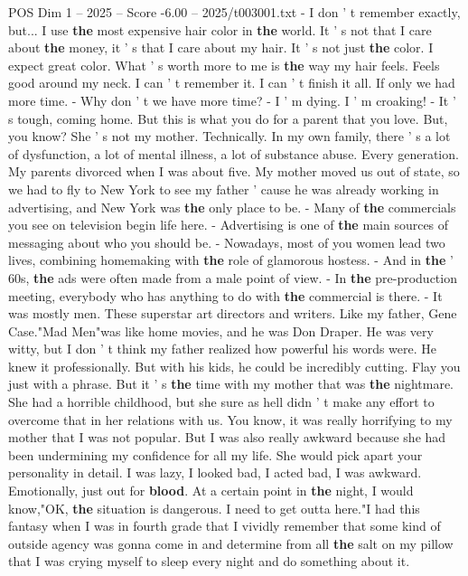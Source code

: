 \begin{textsample}{POS Dim 1 – 2025 – Score -6.00 – 2025/t003001.txt}  \label{ex:f1_pos_080}
- I don ' t remember exactly, but...
I use \textbf{the} most expensive hair color in \textbf{the} world.
It ' s not that I care about \textbf{the} money, it ' s that I care about my hair.
It ' s not just \textbf{the} color.
I expect great color.
What ' s worth more to me is \textbf{the} way my hair feels.
Feels good around my neck.
I can ' t remember it.
I can ' t finish it all.
If only we had more time. - Why don ' t we have more time? - I ' m dying.
I ' m croaking! - It ' s tough, coming home.
But this is what you do for a parent that you love.
But, you know?
She ' s not my mother.
Technically.
In my own family, there ' s a lot of dysfunction, a lot of mental illness, a lot of substance abuse.
Every generation.
My parents divorced when I was about five.
My mother moved us out of state, so we had to fly to New York to see my father ' cause he was already working in advertising, and New York was \textbf{the} only place to be. - Many of \textbf{the} commercials you see on television begin life here. - Advertising is one of \textbf{the} main sources of messaging about who you should be. - Nowadays, most of you women lead two lives, combining homemaking with \textbf{the} role of glamorous hostess. - And in \textbf{the} ' 60s, \textbf{the} ads were often made from a male point of view. - In \textbf{the} pre-production meeting, everybody who has anything to do with \textbf{the} commercial is there. - It was mostly men.
These superstar art directors and writers.
Like my father, Gene Case."Mad Men"was like home movies, and he was Don Draper.
He was very witty, but I don ' t think my father realized how powerful his words were.
He knew it professionally.
But with his kids, he could be incredibly cutting.
Flay you just with a phrase.
But it ' s \textbf{the} time with my mother that was \textbf{the} nightmare.
She had a horrible childhood, but she sure as hell didn ' t make any effort to overcome that in her relations with us.
You know, it was really horrifying to my mother that I was not popular.
But I was also really awkward because she had been undermining my confidence for all my life.
She would pick apart your personality in detail.
I was lazy, I looked bad, I acted bad, I was awkward.
Emotionally, just out for \textbf{blood}.
At a certain point in \textbf{the} night, I would know,"OK, \textbf{the} situation is dangerous.
I need to get outta here."I had this fantasy when I was in fourth grade that I vividly remember that some kind of outside agency was gonna come in and determine from all \textbf{the} salt on my pillow that I was crying myself to sleep every night and do something about it.

\end{textsample}
